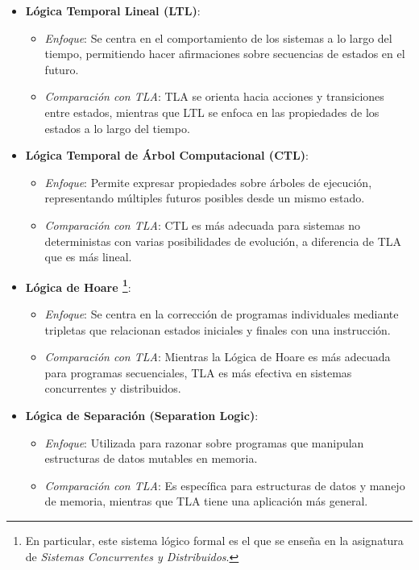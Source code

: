 \begin{itemize}
    \item \textbf{Lógica Temporal Lineal (LTL)}:
    \begin{itemize}
        \item \textit{Enfoque}: Se centra en el comportamiento de los sistemas a lo largo del tiempo, permitiendo hacer afirmaciones sobre secuencias de estados en el futuro.
        \item \textit{Comparación con TLA}: TLA se orienta hacia acciones y transiciones entre estados, mientras que LTL se enfoca en las propiedades de los estados a lo largo del tiempo.
    \end{itemize}
    
    \item \textbf{Lógica Temporal de Árbol Computacional (CTL)}:
    \begin{itemize}
        \item \textit{Enfoque}: Permite expresar propiedades sobre árboles de ejecución, representando múltiples futuros posibles desde un mismo estado.
        \item \textit{Comparación con TLA}: CTL es más adecuada para sistemas no deterministas con varias posibilidades de evolución, a diferencia de TLA que es más lineal.
    \end{itemize}
    
    \item \textbf{Lógica de Hoare \footnote{En particular, este sistema lógico formal es el que se enseña en la asignatura de \textit{Sistemas Concurrentes y Distribuidos}.}}: 
    \begin{itemize}
        \item \textit{Enfoque}: Se centra en la corrección de programas individuales mediante tripletas que relacionan estados iniciales y finales con una instrucción. 
        \item \textit{Comparación con TLA}: Mientras la Lógica de Hoare es más adecuada para programas secuenciales, TLA es más efectiva en sistemas concurrentes y distribuidos.
    \end{itemize}
    
    \item \textbf{Lógica de Separación (Separation Logic)}:
    \begin{itemize}
        \item \textit{Enfoque}: Utilizada para razonar sobre programas que manipulan estructuras de datos mutables en memoria.
        \item \textit{Comparación con TLA}: Es específica para estructuras de datos y manejo de memoria, mientras que TLA tiene una aplicación más general.
    \end{itemize}
\end{itemize}

